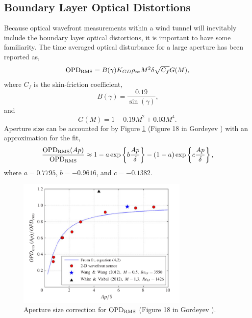 \subsection{Boundary Layer Optical Distortions}
Because optical wavefront measurements within a wind tunnel will inevitably include the boundary layer optical distortions, it is important to have some familiarity.
The time averaged optical disturbance for a large aperture has been reported as,
\begin{equation}
  \operatorname{OPD_{RMS}} = B(\gamma)K_{GD}\rho_\infty M^2\delta\sqrt{C_f}G(M) \textrm{,}
  \label{eqn:02_opdrms_gor}
\end{equation}
where $C_f$ is the skin-friction coefficient,
\begin{equation}
  B(\gamma) = \frac{0.19}{\sin(\gamma)} \textrm{,}
\end{equation}
and
\begin{equation}
  G(M) = 1-0.19M^2+0.03M^4 \textrm{.}
\end{equation}
Aperture size can be accounted for by Figure \ref{fig:02_gordeyev_2014} (Figure 18 in Gordeyev \cite{Gordeyev-2014-jcJndkHM}) with an approximation for the fit,
\begin{equation}
  \frac{\operatorname{OPD_{RMS}}(Ap)}{\operatorname{OPD_{RMS}}} \approx 1-a\exp\left\{b\frac{Ap}{\delta}\right\}-(1-a)\exp\left\{c\frac{Ap}{\delta}\right\} \textrm{,}
  \label{eqn:02_opdrms_gor_fit}
\end{equation}
where $a=0.7795$, $b=-0.9616$, and $c=-0.1382$.
\begin{figure}
  \centering
  \includegraphics[width=0.75\textwidth]{../other-sources/gordeyev_2014_figure_18.png}
  \caption{Aperture size correction for $\operatorname{OPD_{RMS}}$ (Figure 18 in Gordeyev \cite{Gordeyev-2014-jcJndkHM}).}
  \label{fig:02_gordeyev_2014}
\end{figure}

